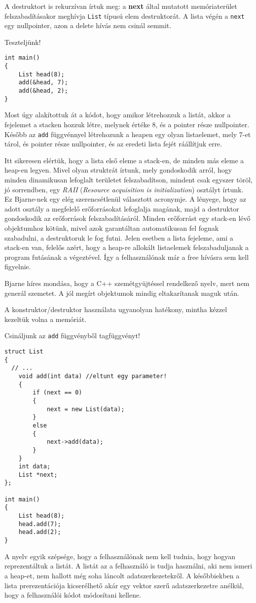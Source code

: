 \documentclass[a4paper,11.5pt,table]{article}
\begin{document}
	\medskip
	A destruktort is rekurzívan írtuk meg: a \textbf{next} által mutatott memóriaterület felszabadításakor meghívja \texttt{List} típusú elem destruktorát. A lista végén a \texttt{next} egy nullpointer, azon a delete hívás nem csinál semmit.
	
	\medskip
	Teszteljünk!
	\begin{lstlisting}
int main()
{
	List head(8);
	add(&head, 7);
	add(&head, 2);
}
	\end{lstlisting}
	Most úgy alakítottuk át a kódot, hogy amikor létrehozzuk a listát, akkor a fejelemet a stacken hozzuk létre, melynek értéke 8, és a pointer része nullpointer. Később az \texttt{add} függvénnyel létrehozunk a heapen egy olyan listaelemet, mely 7-et tárol, és pointer része nullpointer, és az eredeti lista fejét ráállítjuk erre.
	\medskip
	
	Itt sikeresen elértük, hogy a lista első eleme a stack-en, de minden más eleme a heap-en legyen. Mivel olyan struktrát írtunk, mely gondoskodik arról, hogy minden dinamikusan lefoglalt területet felszabadítson, mindent csak egyszer töröl, jó sorrendben, egy  \textit{RAII} (\textit{Resource acquisition is initialization}) osztályt írtunk. Ez Bjarne-nek egy elég szerencsétlenül választott acronymje. A lényege, hogy az adott osztály a megfelelő erőforrásokat lefoglalja magának, majd a destruktor gondoskodik az erőforrások felszabadításáról. Minden erőforrást egy stack-en lévő objektumhoz kötünk, mivel azok garantáltan automatikusan fel fognak szabadulni, a destruktoruk le fog futni. Jelen esetben a lista fejeleme, ami a stack-en van, felelős azért, hogy a heap-re allokált listaelemek felszabaduljanak a program futásának a végeztével. Így a felhasználónak már a free hívásra sem kell figyelnie.
	
	Bjarne híres mondása, hogy a C++ szemétgyüjtéssel rendelkező nyelv, mert nem generál szemetet. A jól megírt objektumok mindig eltakarítanak maguk után. 
	\medskip
	
	A konstruktor/destruktor használata ugyanolyan hatékony, mintha kézzel kezeltük volna a memóriát.
	
	\medskip
	Csináljunk az \texttt{add} függvényből tagfüggvényt!
	\begin{lstlisting}
struct List
{
  // ...	
	void add(int data) //eltunt egy parameter!
	{
		if (next == 0)
		{
			next = new List(data);
		}
		else
		{
			next->add(data);
		}
	}
	int data;
	List *next;
};

int main()
{
	List head(8);
	head.add(7);
	head.add(2);
}
	\end{lstlisting}
	A nyelv egyik szépsége, hogy a felhasználónak nem kell tudnia, hogy hogyan reprezentáltuk a listát. A listát az a felhasználó is tudja használni, aki nem ismeri a heap-et, nem hallott még soha láncolt adatszerkezetekről. A későbbiekben a lista prerezentációja kicserélhető akár egy vektor szerű adatszerkezetre anélkül, hogy a felhasználói kódot módosítani kellene.
	\medskip
	
\end{document}
